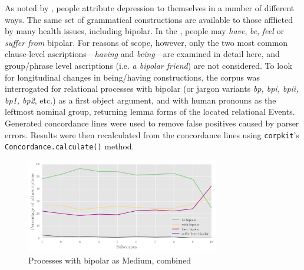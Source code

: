 As noted by \textcite{harvey_disclosures_2012}, people attribute depression to themselves in a number of different ways. The same set of grammatical constructions are available to those afflicted by many health issues, including \gls{bipolar}. In the , people may \emph{have}, \emph{be}, \emph{feel} or \emph{suffer from} bipolar. For reasons of scope, however, only the two most common clause-level ascriptions---\emph{having} and \emph{being}---are examined in detail here, and group\slash phrase level ascriptions (i.e. \emph{a bipolar friend}) are not considered. To look for longitudinal changes in being\slash having constructions, the \gls{corpus} was interrogated for relational processes with bipolar (or jargon variants \emph{bp, bpi, bpii, bp1, bp2}, etc.) as a first object argument, and with human pronouns as the leftmost nominal group, returning lemma forms of the located relational Events. Generated concordance lines were used to remove false positives caused by parser errors. Results were then recalculated from the concordance lines using \texttt{corpkit}'s \texttt{Concordance.calculate()} method.


\begin{figure}[htb]
  \begin{center}
  \includegraphics[width=0.75\textwidth]{../images/being_having.png}
  \end{center}
  \caption{Processes with bipolar as Medium, combined}
  \label{fig:behave}
  \end{figure}


